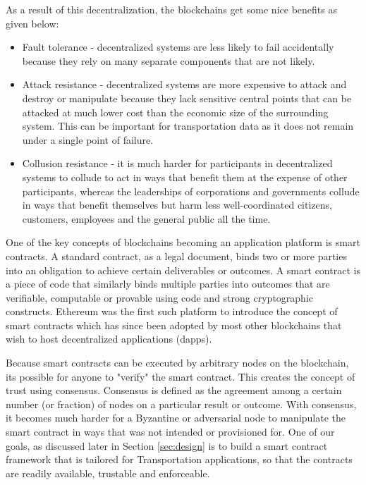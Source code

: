 As a result of this decentralization, the blockchains get some nice benefits as given below:
\begin{itemize}

    \item Fault tolerance - decentralized systems are less likely to fail accidentally because they rely on many separate
components that are not likely.
    \item Attack resistance - decentralized systems are more expensive to attack and destroy or manipulate because they lack
sensitive central points that can be attacked at much lower cost than the economic size of the surrounding system. This
can be important for transportation data as it does not remain under a single point of failure.
    \item Collusion resistance - it is much harder for participants in decentralized systems to collude to act in ways that
benefit them at the expense of other participants, whereas the leaderships of corporations and governments collude in
ways that benefit themselves but harm less well-coordinated citizens, customers, employees and the general public all
the time.
\end{itemize}

One of the key concepts of blockchains becoming an application platform is smart contracts. A standard contract, as a
legal document, binds two or more parties into an obligation to achieve certain deliverables or outcomes. A smart
contract is a piece of code that similarly binds multiple parties into outcomes that are verifiable, computable or
provable using code and strong cryptographic constructs. Ethereum was the first such platform to introduce the concept
of smart contracts which has since been adopted by most other blockchains that wish to host decentralized applications
(dapps).

Because smart contracts can be executed by arbitrary nodes on the blockchain, its possible for anyone to "verify" the
smart contract. This creates the concept of trust using consensus. Consensus is defined as the agreement among a
certain number (or fraction) of nodes on a particular result or outcome. With consensus, it becomes much harder for a
Byzantine or adversarial node \cite{lamport_byz} to manipulate the smart contract in ways that was not intended or
provisioned for. One of our goals, as discussed later in Section \ref{sec:design} is to build a smart contract framework
that is tailored for Transportation applications, so that the contracts are readily available, trustable and
enforceable. 

